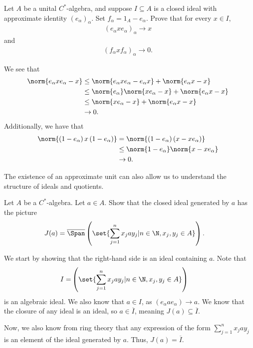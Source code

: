 \documentclass[10pt]{mypackage}
\begin{document}
\begin{exercise}
  Let $A$ be a unital $C^{\ast}$-algebra, and suppose $I\subseteq A$ is a closed ideal with approximate identity $\left(e_{\alpha}\right)_{\alpha}$. Set $f_{\alpha} = 1_A - e_{\alpha}$. Prove that for every $x\in I$,
  \begin{align*}
    \left(e_{\alpha}xe_{\alpha}\right)_{\alpha}\rightarrow x
  \end{align*}
  and
  \begin{align*}
    \left(f_{\alpha}xf_{\alpha}\right)_{\alpha}\rightarrow 0.
  \end{align*}
\end{exercise}
\begin{solution}
  We see that
  \begin{align*}
    \norm{e_{\alpha}xe_{\alpha}-x} &\leq \norm{e_{\alpha}xe_{\alpha}-e_{\alpha}x} + \norm{e_{\alpha}x-x}\\
                                   &\leq \norm{e_{\alpha}}\norm{xe_{\alpha}-x} + \norm{e_{\alpha}x-x}\\
                                   &\leq \norm{xe_{\alpha}-x} + \norm{e_{\alpha}x - x}\\
                                   &\rightarrow 0.
  \end{align*}
  Additionally, we have that
  \begin{align*}
    \norm{\left(1-e_{\alpha}\right)x\left(1-e_{\alpha}\right)} &= \norm{\left(1-e_{\alpha}\right)\left(x-xe_{\alpha}\right)} \\
                                                               &\leq \norm{1-e_{\alpha}}\norm{x-xe_{\alpha}}\\
                                                               &\rightarrow 0.
  \end{align*}
\end{solution}
The existence of an approximate unit can also allow us to understand the structure of ideals and quotients.
\begin{exercise}
  Let $A$ be a $C^{\ast}$-algebra. Let $a\in A$. Show that the closed ideal generated by $a$ has the picture
  \begin{align*}
    J(a) &= \overline{\Span}\left(\set{\sum_{j=1}^{n}x_jay_j | n\in\N,x_j,y_j\in A}\right).
  \end{align*}
\end{exercise}
\begin{solution}[]
  We start by showing that the right-hand side is an ideal containing $a$. Note that
  \begin{align*}
    I = \span\left(\set{\sum_{j=1}^{n}x_jay_j | n\in\N,x_j,y_j\in A}\right)
  \end{align*}
  is an algebraic ideal. We also know that $a\in I$, as $\left(e_{\alpha}a e_{\alpha}\right)\rightarrow a$. We know that the closure of any ideal is an ideal, so $a\in \overline{I}$, meaning $J(a)\subseteq \overline{I}$.\newline

  Now, we also know from ring theory that any expression of the form $\sum_{j=1}^{n}x_jay_j$ is an element of the ideal generated by $a$. Thus, $J(a) = \overline{I}$.
\end{solution}
\end{document}
